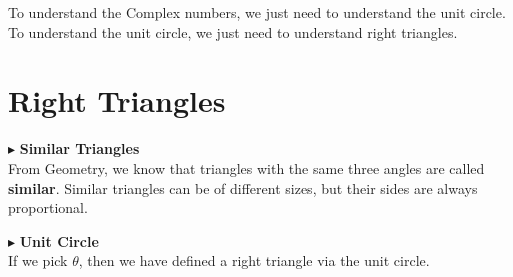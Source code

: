 \documentclass{ximera}
\begin{document}
To understand the Complex numbers, we just need to understand the unit circle.  To understand the unit circle, we just need to understand right triangles.







\section{Right Triangles}




$\blacktriangleright$ \textbf{Similar Triangles} \\

From Geometry, we know that triangles with the same three angles are called \textbf{similar}.  Similar triangles can be of different sizes, but their sides are always proportional.







$\blacktriangleright$ \textbf{Unit Circle} \\




If we pick $\theta$, then we have defined a right triangle via the unit circle.
\end{document}
